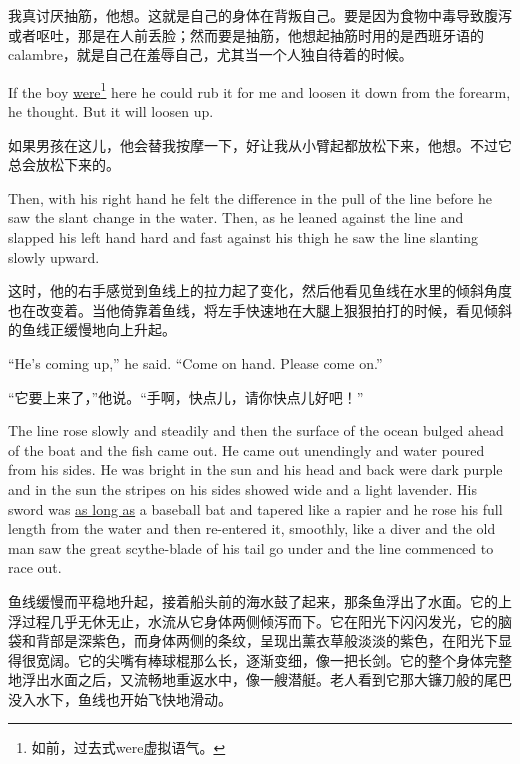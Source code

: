 \begin{paracol}{2}
\switchcolumn

我真讨厌抽筋，他想。这就是自己的身体在背叛自己。要是因为食物中毒导致腹泻或者呕吐，那是在人前丢脸；然而要是抽筋，他想起抽筋时用的是西班牙语的calambre，就是自己在羞辱自己，尤其当一个人独自待着的时候。

\switchcolumn*

If the boy \uline{were}\footnote{如前，过去式were虚拟语气。} here he could \gls{rub}
it for me and \gls{loosen} it down from the \gls{forearm}, he thought. But
it will loosen up.

\switchcolumn

如果男孩在这儿，他会替我按摩一下，好让我从小臂起都放松下来，他想。不过它总会放松下来的。

\switchcolumn*

Then, with his right hand he felt the difference in the pull of the line
before he saw the slant change in the water. Then, as he leaned against the
line and slapped his left hand hard and fast against his \gls{thigh} he saw the
line slanting slowly upward.

\switchcolumn

这时，他的右手感觉到鱼线上的拉力起了变化，然后他看见鱼线在水里的倾斜角度也在改变着。当他倚靠着鱼线，将左手快速地在大腿上狠狠拍打的时候，看见倾斜的鱼线正缓慢地向上升起。

\switchcolumn*

``He's coming up,'' he said. ``Come on hand. Please come on.''

\switchcolumn

“它要上来了，”他说。“手啊，快点儿，请你快点儿好吧！”

\switchcolumn*

The line rose slowly and steadily and then the surface of the ocean
\gls{bulged} ahead of the boat and the fish came out. He came out
\gls{unendingly} and water \gls{poured} from his sides. He was bright in the
sun and his head and back were dark purple and in the sun the stripes on his
sides showed wide and a light lavender. His sword was \uline{as long as} a baseball
\gls{bat} and \gls{tapered} like a rapier and he rose his full length from
the water and then re-entered it, \gls{smoothly}, like a diver and the old
man saw the great scythe-blade of his tail go under and the line commenced
to race out.

\switchcolumn

鱼线缓慢而平稳地升起，接着船头前的海水鼓了起来，那条鱼浮出了水面。它的上浮过程几乎无休无止，水流从它身体两侧倾泻而下。它在阳光下闪闪发光，它的脑袋和背部是深紫色，而身体两侧的条纹，呈现出薰衣草般淡淡的紫色，在阳光下显得很宽阔。它的尖嘴有棒球棍那么长，逐渐变细，像一把长剑。它的整个身体完整地浮出水面之后，又流畅地重返水中，像一艘潜艇。老人看到它那大镰刀般的尾巴没入水下，鱼线也开始飞快地滑动。


\end{paracol}
